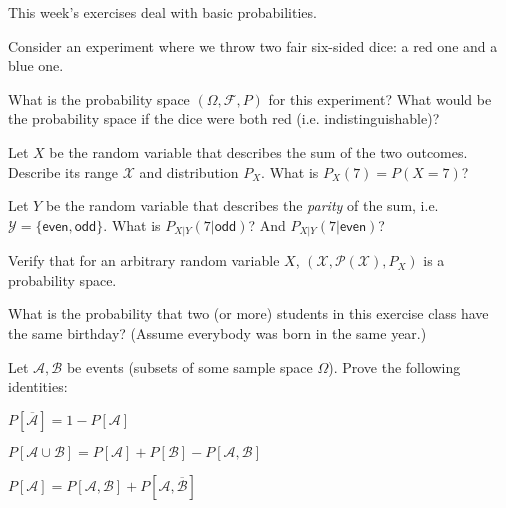 \documentclass[a4paper,10pt,landscape,twocolumn]{scrartcl}
\begin{document}
\practiceproblems

{\sffamily\noindent
This week's exercises deal with basic probabilities. \practiceinstructions
}

\enlargethispage{1cm}
\begin{exercise}
Consider an experiment where we throw two fair six-sided dice: a red one and a blue one.
	\begin{subex}
	What is the probability space $(\Omega,\mathcal{F},P)$ for this experiment? What would be the probability space if the dice were both red (i.e. indistinguishable)?
	\end{subex}
	\begin{subex}
	Let $X$ be the random variable that describes the sum of the two outcomes. Describe its range $\mathcal{X}$ and distribution $P_X$. What is $P_X(7) = P(X=7)$?
	\end{subex}
	\begin{subex}
	Let $Y$ be the random variable that describes the \emph{parity} of the sum, i.e. $\mathcal{Y} = \{\mathsf{even}, \mathsf{odd}\}$. What is $P_{X|Y}(7|\mathsf{odd})$? And $P_{X|Y}(7|\mathsf{even})$?
	\end{subex}
	\begin{subex}
	Verify that for an arbitrary random variable $X$, $(\mathcal{X},\mathcal{P}(\mathcal{X}),P_X)$ is a probability space.
	\end{subex}
\end{exercise}

\begin{exercise}
What is the probability that two (or more) students in this exercise class have the same birthday? (Assume everybody was born in the same year.)
\end{exercise}

\begin{exercise}[Events]
Let $\mathcal{A}, \mathcal{B}$ be events (subsets of some sample space $\Omega$). Prove the following identities:
	\begin{subex}
	$P[\overline{\mathcal{A}}] = 1 - P[\mathcal{A}]$
	\end{subex}
	
	\begin{subex}
	$P[\mathcal{A} \cup \mathcal{B}] = P[\mathcal{A}] + P[\mathcal{B}] - P[\mathcal{A},\mathcal{B}]$
	\end{subex}
	
	\begin{subex}
	$P[\mathcal{A}] = P[\mathcal{A},\mathcal{B}] + P[\mathcal{A},\overline{\mathcal{B}}]$
	\end{subex}
\end{exercise}
\end{document}
